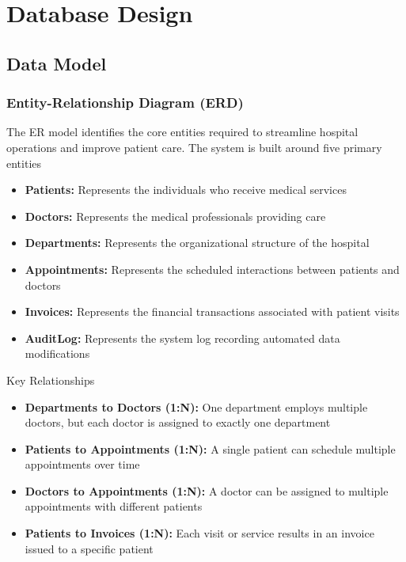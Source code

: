 \section{Database Design}

\subsection{Data Model}
\subsubsection*{Entity-Relationship Diagram (ERD)}

The ER model identifies the core entities required to streamline hospital operations and improve patient care. The system is built around five primary entities
\begin{itemize}
    \item \textbf{Patients:} Represents the individuals who receive medical services
    \item \textbf{Doctors:} Represents the medical professionals providing care
    \item \textbf{Departments:} Represents the organizational structure of the hospital
    \item \textbf{Appointments:} Represents the scheduled interactions between patients and doctors
    \item \textbf{Invoices:} Represents the financial transactions associated with patient visits
    \item \textbf{AuditLog:} Represents the system log recording automated data modifications
\end{itemize}

Key Relationships
\begin{itemize}
    \item \textbf{Departments to Doctors (1:N):} One department employs multiple doctors, but each doctor is assigned to exactly one department
    \item \textbf{Patients to Appointments (1:N):} A single patient can schedule multiple appointments over time
    \item \textbf{Doctors to Appointments (1:N):} A doctor can be assigned to multiple appointments with different patients
    \item \textbf{Patients to Invoices (1:N):} Each visit or service results in an invoice issued to a specific patient
\end{itemize}

